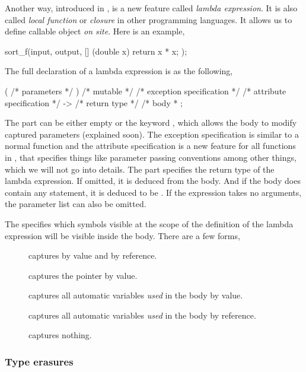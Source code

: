 Another way, introduced in \cppoo, is a new feature called \emph{lambda
  expression}. It is also called \emph{local function} or \emph{closure} in
other programming languages. It allows us to define callable object \emph{on
  site}. Here is an example,
\begin{cppcode}
sort_f(input, output, [] (double x) { return x * x; });
\end{cppcode}
The full declaration of a lambda expression is as the following,
\begin{cppcode}
[ /* capture */ ] ( /* parameters */ ) /* mutable */
/* exception specification */
/* attribute specification */
-> /* return type */ { /* body * };
\end{cppcode}
The  part can be either empty or the keyword
, which allows the body to modify captured parameters
(explained soon). The exception specification is similar to a normal function
and the attribute specification is a new feature for all functions in \cppoo,
that specifies things like parameter passing conventions among other things,
which we will not go into details. The part 
specifies the return type of the lambda expression. If omitted, it is deduced
from the body. And if the body does contain any  statement,
it is deduced to be . If the expression takes no arguments,
the parameter list can also be omitted.

The  specifies which symbols visible at the scope of
the definition of the lambda expression will be visible inside the body. There
are a few forms,
\begin{description}
  \item[\cppinline{[a, &b]}] captures  by value and 
    by reference.
  \item[\cppinline{[this]}] captures the  pointer by value.
  \item[\cppinline{[=]}] captures all automatic variables \emph{used} in the
    body by value.
  \item[\cppinline{[&]}] captures all automatic variables \emph{used} in the
    body by reference.
  \item[\cppinline{[]}] captures nothing.
\end{description}

\subsubsection{Type erasures}
\label{ssub:Type erasures}

